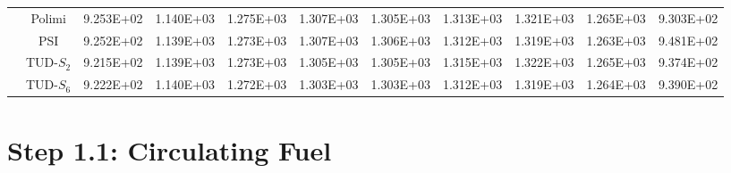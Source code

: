 \documentclass[letterpaper,11pt]{article}
\begin{document}
\begin{table}[htbp!]
\begin{tabular}{c c c c c c c c c c c}
		& Polimi & 9.253E+02 & 1.140E+03 & 1.275E+03 & 1.307E+03 & 1.305E+03 & 1.313E+03 & 1.321E+03 & 1.265E+03 & 9.303E+02 \\
		& PSI & 9.252E+02 & 1.139E+03 & 1.273E+03 & 1.307E+03 & 1.306E+03 & 1.312E+03 & 1.319E+03 & 1.263E+03 & 9.481E+02 \\
		& TUD-$S_2$ & 9.215E+02 & 1.139E+03 & 1.273E+03 & 1.305E+03 & 1.305E+03 & 1.315E+03 & 1.322E+03 & 1.265E+03 & 9.374E+02 \\
		& TUD-$S_6$ & 9.222E+02 & 1.140E+03 & 1.272E+03 & 1.303E+03 & 1.303E+03 & 1.312E+03 & 1.319E+03 & 1.264E+03 & 9.390E+02 \\
		\bottomrule
	\end{tabular}
\end{table}

\pagebreak

\section*{Step 1.1: Circulating Fuel}
\end{document}
